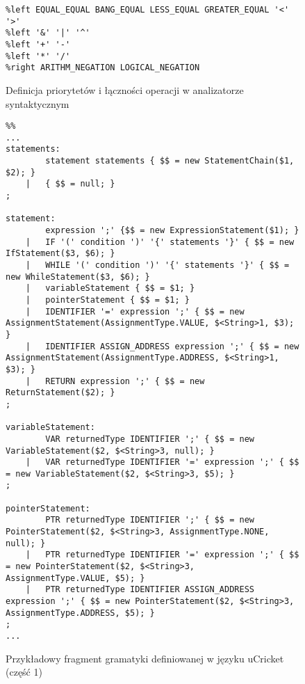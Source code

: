 \begin{figure}
\begin{lstlisting}
%left EQUAL_EQUAL BANG_EQUAL LESS_EQUAL GREATER_EQUAL '<' '>' 
%left '&' '|' '^'
%left '+' '-'
%left '*' '/'
%right ARITHM_NEGATION LOGICAL_NEGATION
\end{lstlisting}
\caption{Definicja priorytetów i łączności operacji w analizatorze syntaktycznym}
\label{fig:lst:parser-priorytety}
\end{figure}

\begin{figure}
\begin{lstlisting}
%%
...
statements:
        statement statements { $$ = new StatementChain($1, $2); }
    |   { $$ = null; }
;

statement: 
        expression ';' {$$ = new ExpressionStatement($1); }
    |   IF '(' condition ')' '{' statements '}' { $$ = new IfStatement($3, $6); }
    |   WHILE '(' condition ')' '{' statements '}' { $$ = new WhileStatement($3, $6); }
    |   variableStatement { $$ = $1; }
    |   pointerStatement { $$ = $1; }
    |   IDENTIFIER '=' expression ';' { $$ = new AssignmentStatement(AssignmentType.VALUE, $<String>1, $3); }
    |   IDENTIFIER ASSIGN_ADDRESS expression ';' { $$ = new AssignmentStatement(AssignmentType.ADDRESS, $<String>1, $3); }
    |   RETURN expression ';' { $$ = new ReturnStatement($2); }
;

variableStatement:
        VAR returnedType IDENTIFIER ';' { $$ = new VariableStatement($2, $<String>3, null); }
    |   VAR returnedType IDENTIFIER '=' expression ';' { $$ = new VariableStatement($2, $<String>3, $5); }
;

pointerStatement:
        PTR returnedType IDENTIFIER ';' { $$ = new PointerStatement($2, $<String>3, AssignmentType.NONE, null); }
    |   PTR returnedType IDENTIFIER '=' expression ';' { $$ = new PointerStatement($2, $<String>3, AssignmentType.VALUE, $5); }
    |   PTR returnedType IDENTIFIER ASSIGN_ADDRESS expression ';' { $$ = new PointerStatement($2, $<String>3, AssignmentType.ADDRESS, $5); }
;
...
\end{lstlisting}
\caption{Przykładowy fragment gramatyki definiowanej w języku uCricket (część 1)}
\label{fig:lst:parser-gramatyka}
\end{figure} 

